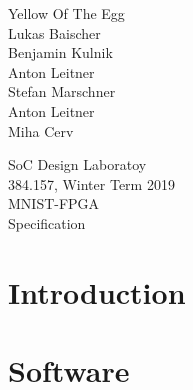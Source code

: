 \documentclass[a4paper]{article}
\begin{document}

\begin{titlepage}
	
	\begin{flushright}
		
		
		\Large 
		Yellow Of The Egg\\
		\large
		Lukas Baischer	\\
		Benjamin Kulnik	\\
		Anton Leitner \\
		Stefan Marschner \\
		Anton Leitner	\\
		Miha Cerv \\
		
	\end{flushright}
	
	\vspace{5em}
	
	\begin{center}
		{\Large SoC Design Laboratoy}\\[1em]
		{\large 384.157, Winter Term 2019} \\[5em]

		
		{\Huge MNIST-FPGA\\[.5em]
		\huge Specification}\\[10em]
	\end{center}

\end{titlepage}


\begin{acronym}
\end{acronym}
\section{Introduction}




\section{Software}





\end{document}
